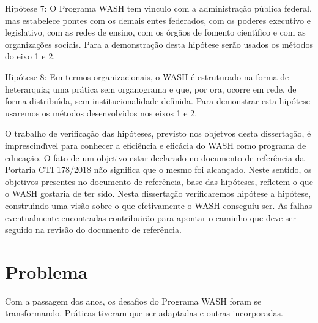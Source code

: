 \documentclass[
12pt,		%
openright,	%
twoside,  %
a4paper,			%
chapter=TITLE,		%
english,			%
french,				%
spanish,			%
brazil				%
]{USPSC-classe/USPSC}
\begin{document}
\begin{alineas}
\item Hip\'otese 7: O Programa WASH tem v\'{\i}nculo com a administra\c{c}\~ao p\'ublica federal, mas estabelece pontes com os demais entes federados, com os poderes executivo e legislativo, com as redes de ensino, com os \'org\~aos de fomento cient\'{\i}fico e com as organiza\c{c}\~oes sociais. Para a demonstra\c{c}\~ao desta hip\'otese ser\~ao usados os m\'etodos do eixo 1 e 2.
\item Hip\'otese 8: Em termos organizacionais, o WASH \'e estruturado na forma de heterarquia; uma pr\'atica sem organograma e que, por ora, ocorre em rede, de forma distribu\'{\i}da, sem institucionalidade definida. Para demonstrar esta hip\'otese usaremos os m\'etodos desenvolvidos nos eixos 1 e 2.
\end{alineas}

O trabalho de verifica\c{c}\~ao das hip\'oteses, previsto nos objetvos desta disserta\c{c}\~ao, \'e imprescind\'{\i}vel para conhecer a efici\^encia e efic\'acia do WASH como programa de educa\c{c}\~ao. O fato de um objetivo estar declarado no documento de refer\^encia da Portaria CTI 178/2018 n\~ao significa que o mesmo foi alcan\c{c}ado. Neste sentido, os objetivos presentes no  documento de refer\^encia, base das hip\'oteses, refletem \textquotedbl o que o WASH gostaria de ter sido\textquotedbl . Nesta disserta\c{c}\~ao verificaremos hip\'otese a hip\'otese, construindo uma vis\~ao sobre \textquotedbl o que efetivamente o WASH conseguiu ser\textquotedbl . As falhas eventualmente encontradas contribuir\~ao para apontar o caminho que deve ser seguido na revis\~ao do documento de refer\^encia.

















\section[Problema]{Problema}\label{Problema}
Com a passagem dos anos, os desafios do Programa WASH foram se transformando.  Pr\'aticas tiveram que ser adaptadas e outras incorporadas.
\end{document}
